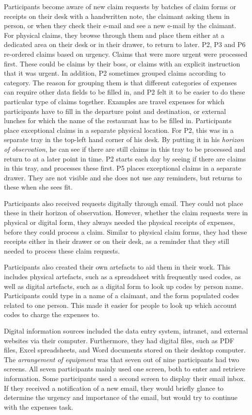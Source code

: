 Participants become aware of new claim requests by batches of claim forms or receipts on their desk with a handwritten note, the claimant asking them in person, or when they check their e-mail and see a new e-mail by the claimant. For physical claims, they browse through them and place them either at a dedicated area on their desk or in their drawer, to return to later. P2, P3 and P6 re-ordered claims based on urgency. Claims that were more urgent were processed first. These could be claims by their boss, or claims with an explicit instruction that it was urgent. In addition, P2 sometimes grouped claims according to category. The reason for grouping them is that different categories of expenses can require other data fields to be filled in, and P2 felt it to be easier to do these particular type of claims together. Examples are travel expenses for which participants have to fill in the departure point and destination, or external lunches for which the name of the restaurant has to be filled in. Participants place exceptional claims in a separate physical location. For P2, this was in a separate tray in the top-left hand corner of his desk. By putting it in his \textit{horizon of observation}, he can see if there are still claims in this tray to be processed and return to at a later point in time. P2 starts each day by seeing if there are claims in this tray, and processes these first. P5 places exceptional claims in a separate drawer. They are not visible and she does not use any reminders, but returns to these when she sees fit.

Participants also received requests digitally through email. They could not place these in their horizon of observation. However, whether the claim requests were in physical or digital form, they always needed the physical receipts of expenses, before they could process a claim. Similar to physical claim forms, they had these receipts either in their drawer or on their desk, as a reminder that they still needed to process these claim requests.

Participants also created their own artefacts to aid them in their work. This includes physical artefacts, such as a spreadsheet with frequently used codes, as well as digital artefacts, such as a digital form to look up codes by person name. Participants could type in a name of a claimant, and the form populated codes related to one person. This made it easier for people to look up which account codes to charge the expenses to. 

Digital information sources included the data entry system, intranet, and external websites via their computer. Furthermore, they had digital files, such as PDF files, Excel spreadsheets, and Word documents stored on their desktop computer. The \textit{arrangement of equipment} was that seven out of nine participants had two screens. All seven participants mainly used one screen, both to enter and retrieve information. Some participants used a second screen to display their email inbox. If they received a notification of a new email, they would briefly glance to determine the urgency and importance of the email, but would try to continue with the expenses task. 

